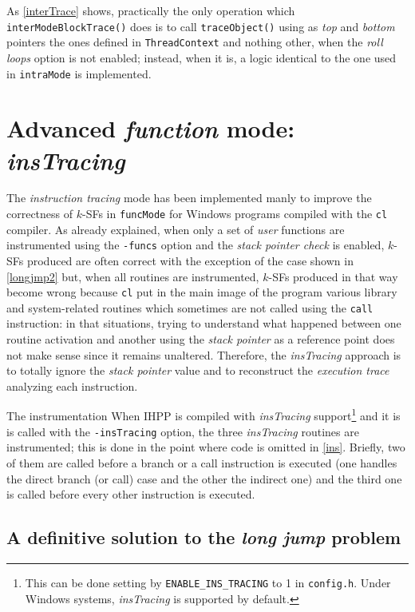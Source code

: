 \documentclass[a4paper,10pt]{report}
\begin{document}
\noindent
As \cref{interTrace} shows, practically the only operation 
which \verb|interModeBlockTrace()| does is to call \verb|traceObject()|
using as \emph{top} and \emph{bottom} pointers the ones defined in \verb|ThreadContext|
and nothing other, when the \emph{roll loops} option is not enabled;
instead, when it is, a logic identical to the one used in \verb|intraMode| is implemented.

\section{Advanced \emph{function} mode: \emph{insTracing}}

The \emph{instruction tracing} mode has been implemented manly to
improve the correctness of $k$-SFs in \verb|funcMode| for Windows 
programs compiled with the \verb|cl| compiler.
As already explained, when only a set of \emph{user} functions 
are instrumented using the \verb|-funcs| option and the \emph{stack pointer check}
is enabled, $k$-SFs produced are often correct with the exception of the case
shown in \cref{longjmp2} but, when all routines are instrumented, 
$k$-SFs produced in that way become wrong because \verb|cl| put in the main image
of the program various library and system-related routines which sometimes are not
called using the \verb|call| instruction: in that situations, trying 
to understand what happened between one routine activation and another
using the \emph{stack pointer} as a reference point does not make sense
since it remains unaltered. Therefore, the \emph{insTracing} approach is to
totally ignore the \emph{stack pointer} value and to reconstruct the 
\emph{execution trace} analyzing each instruction. 

\begin{paragraph}{The instrumentation}
When IHPP is compiled with \emph{insTracing}
support\footnote{This can be done setting by \texttt{ENABLE\_INS\_TRACING} to 1 in \texttt{config.h}. Under Windows systems, \emph{insTracing} is supported by default.}
and it is is called with the \verb|-insTracing| option, the three \emph{insTracing} 
routines are instrumented; this is done in the point where code is omitted 
in \cref{ins}. Briefly, two of them are called before a branch or a call instruction
is executed (one handles the direct branch (or call) case and the other the indirect one)
and the third one is called before every other instruction is executed.
\end{paragraph}

\subsection{A definitive solution to the \emph{long jump} problem}
\end{document}
